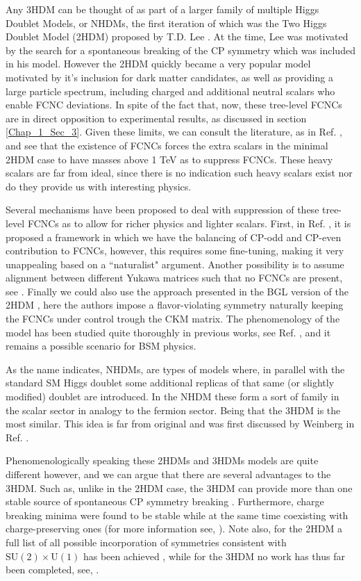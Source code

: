 
Any 3HDM can be thought of as part of a larger family of multiple Higgs Doublet Models, or NHDMs, the first iteration of which was the Two Higgs Doublet Model (2HDM) proposed by T.D. Lee \cite{Lee1973}. At the time, Lee was motivated by the search for a spontaneous breaking of the CP symmetry which was included in his model.  However the 2HDM quickly became a very popular model motivated by it's inclusion for dark matter candidates, as well as providing a large particle spectrum, including charged and additional neutral scalars who enable FCNC deviations. In spite of the fact that, now, these tree-level FCNCs are in direct opposition to experimental results, as discussed in section \ref{Chap_1_Sec_3}. Given these limits, we can consult the literature, as in Ref. \cite{Branco:1999fs}, and see that the existence of FCNCs forces the extra scalars in the minimal 2HDM case to have masses above 1 TeV as to suppress FCNCs. These heavy scalars are far from ideal, since there is no indication such heavy scalars exist nor do they provide us with interesting physics. 

Several mechanisms have been proposed to deal with suppression of these tree-level FCNCs as to allow for richer physics and lighter scalars. First, in Ref. \cite{ferreira2019strong}, it is proposed a framework in which we have the balancing of CP-odd and CP-even contribution to FCNCs, however, this requires some fine-tuning, making it very unappealing based on a ``naturalist" argument. Another possibility is to assume alignment between different Yukawa matrices such that no FCNCs are present, see \cite{Jung_2011}. Finally we could also use the approach presented in the BGL version of the 2HDM \cite{Branco_1996}, here the authors impose a flavor-violating symmetry naturally keeping the FCNCs under control trough the CKM matrix. The phenomenology of the model has been studied quite thoroughly in previous works, see Ref. \cite{Botella_2016}, and it remains a possible scenario for BSM physics.

As the name indicates, NHDMs, are types of models where, in parallel with the standard SM Higgs doublet some additional replicas of that same  (or slightly modified) doublet are introduced. In the NHDM these form a sort of family in the scalar sector in analogy to the fermion sector. Being that the 3HDM is the most similar. This idea is far from original and was first discussed by Weinberg in Ref. \cite{Weinberg1976}.

Phenomenologically speaking these 2HDMs and 3HDMs models are quite different however, and we can argue that there are several advantages to the 3HDM. Such as, unlike in the 2HDM case, the 3HDM can provide more than one stable source of spontaneous CP symmetry breaking \cite{Branco_2012}. Furthermore, charge breaking minima were found to be stable while at the same time coexisting with charge-preserving ones (for more information see, \cite{Barroso_2006}). Note also, for the 2HDM a full list of all possible incorporation of symmetries consistent with $\mathrm{SU(2)}\times\mathrm{U(1)}$ has been achieved \cite{Ivanov_2008}, while for the 3HDM no work has thus far been completed, see, \cite{Ivanov_2015}. 

